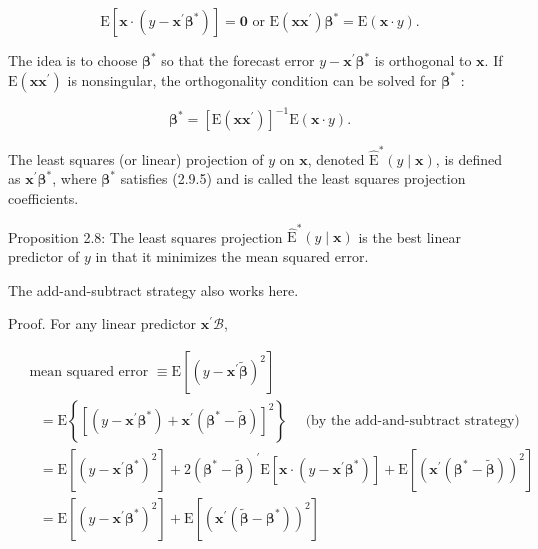 \documentclass[10pt]{article}
\begin{document}
\begin{equation*}
\mathrm{E}\left[\mathbf{x} \cdot\left(y-\mathbf{x}^{\prime} \boldsymbol{\beta}^{*}\right)\right]=\mathbf{0} \text { or } \mathrm{E}\left(\mathbf{x x}^{\prime}\right) \boldsymbol{\beta}^{*}=\mathrm{E}(\mathbf{x} \cdot y) . \tag{2.9.5}
\end{equation*}


The idea is to choose $\boldsymbol{\beta}^{*}$ so that the forecast error $y-\mathbf{x}^{\prime} \boldsymbol{\beta}^{*}$ is orthogonal to $\mathbf{x}$. If $\mathrm{E}\left(\mathbf{x x}^{\prime}\right)$ is nonsingular, the orthogonality condition can be solved for $\boldsymbol{\beta}^{*}$ :


\begin{equation*}
\boldsymbol{\beta}^{*}=\left[\mathrm{E}\left(\mathbf{x} \mathbf{x}^{\prime}\right)\right]^{-1} \mathrm{E}(\mathbf{x} \cdot y) . \tag{2.9.6}
\end{equation*}


The least squares (or linear) projection of $y$ on $\mathbf{x}$, denoted $\widehat{\mathrm{E}}^{*}(y \mid \mathbf{x})$, is defined as $\mathbf{x}^{\prime} \boldsymbol{\beta}^{*}$, where $\boldsymbol{\beta}^{*}$ satisfies (2.9.5) and is called the least squares projection coefficients.

Proposition 2.8: The least squares projection $\widehat{\mathrm{E}}^{*}(y \mid \mathbf{x})$ is the best linear predictor of $y$ in that it minimizes the mean squared error.

The add-and-subtract strategy also works here.

Proof. For any linear predictor $\mathbf{x}^{\prime} \boldsymbol{\mathcal { B }}$,

$$
\begin{aligned}
& \text { mean squared error } \equiv \mathrm{E}\left[\left(y-\mathbf{x}^{\prime} \tilde{\boldsymbol{\beta}}\right)^{2}\right] \\
& \quad=\mathrm{E}\left\{\left[\left(y-\mathbf{x}^{\prime} \boldsymbol{\beta}^{*}\right)+\mathbf{x}^{\prime}\left(\boldsymbol{\beta}^{*}-\widetilde{\boldsymbol{\beta}}\right)\right]^{2}\right\} \quad \text { (by the add-and-subtract strategy) } \\
& \quad=\mathrm{E}\left[\left(y-\mathbf{x}^{\prime} \boldsymbol{\beta}^{*}\right)^{2}\right]+2\left(\boldsymbol{\beta}^{*}-\widetilde{\boldsymbol{\beta}}\right)^{\prime} \mathrm{E}\left[\mathbf{x} \cdot\left(y-\mathbf{x}^{\prime} \boldsymbol{\beta}^{*}\right)\right]+\mathrm{E}\left[\left(\mathbf{x}^{\prime}\left(\boldsymbol{\beta}^{*}-\widetilde{\boldsymbol{\beta}}\right)\right)^{2}\right] \\
& \quad=\mathrm{E}\left[\left(y-\mathbf{x}^{\prime} \boldsymbol{\beta}^{*}\right)^{2}\right]+\mathrm{E}\left[\left(\mathbf{x}^{\prime}\left(\widetilde{\boldsymbol{\beta}}-\boldsymbol{\beta}^{*}\right)\right)^{2}\right]
\end{aligned}
$$
\end{document}
